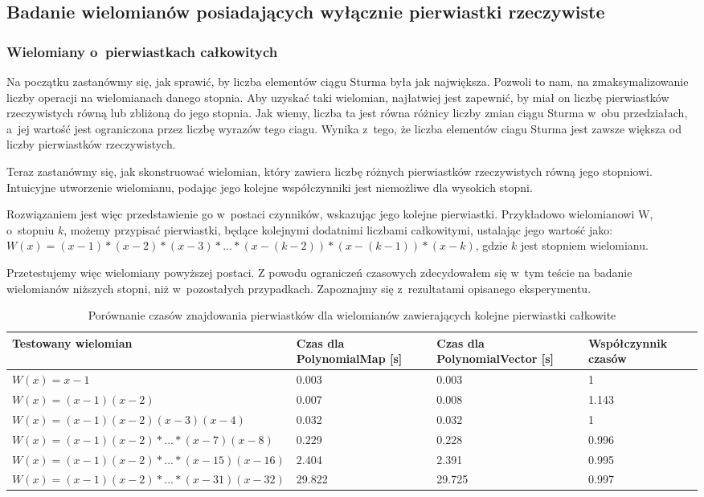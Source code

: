 \subsection{Badanie wielomianów posiadających wyłącznie pierwiastki rzeczywiste}

\subsubsection{Wielomiany o~pierwiastkach całkowitych}

Na początku zastanówmy się, jak sprawić, by liczba elementów ciągu Sturma była jak największa. Pozwoli to nam, na zmaksymalizowanie liczby operacji na wielomianach danego stopnia. Aby uzyskać taki wielomian, najłatwiej jest zapewnić, by miał on liczbę pierwiastków rzeczywistych równą lub zbliżoną do jego stopnia. Jak wiemy, liczba ta jest równa różnicy liczby zmian ciągu Sturma w~obu przedziałach, a~jej wartość jest ograniczona przez liczbę wyrazów tego ciagu. Wynika z~tego, że liczba elementów ciagu Sturma jest zawsze większa od liczby pierwiastków rzeczywistych.

Teraz zastanówmy się, jak skonstruować wielomian, który zawiera liczbę różnych pierwiastków rzeczywistych równą jego stopniowi. Intuicyjne utworzenie wielomianu, podając jego kolejne współczynniki jest niemożliwe dla wysokich stopni.

Rozwiązaniem jest więc przedstawienie go w~postaci czynników, wskazując jego kolejne pierwiastki. Przykładowo wielomianowi W, o~stopniu $k$, możemy przypisać pierwiastki, będące kolejnymi dodatnimi liczbami całkowitymi, ustalając jego wartość jako: \\ $W(x)=(x-1)*(x-2)*(x-3)*...*(x-(k-2))*(x-(k-1))*(x-k)$, gdzie $k$ jest stopniem wielomianu.

Przetestujemy więc wielomiany powyższej postaci. Z powodu ograniczeń czasowych zdecydowałem się w~tym teście na badanie wielomianów niższych stopni, niż w~pozostałych przypadkach. Zapoznajmy się z~rezultatami opisanego eksperymentu.

\begin{table}[H]
	\begin{tabular}{ |p{4cm}|p{2.75cm}|p{2.75cm}|p{3.5cm}|} 
		\hline
		Testowany wielomian & Czas dla PolynomialMap [s] & Czas dla PolynomialVector [s] & Współczynnik czasów \\
		\hline
		$W(x) = x-1$ & 0.003 & 0.003 & 1 \\
		$W(x) = (x-1)(x-2)$ & 0.007 & 0.008 & 1.143 \\
		$W(x) = (x-1)(x-2)(x-3)(x-4)$ & 0.032 & 0.032 & 1 \\
		$W(x) = (x-1)(x-2)*...*(x-7)(x-8)$ & 0.229 & 0.228 & 0.996 \\
		$W(x) = (x-1)(x-2)*...*(x-15)(x-16)$ & 2.404 & 2.391 & 0.995 \\
		$W(x) = (x-1)(x-2)*...*(x-31)(x-32)$ & 29.822 & 29.725 & 0.997 \\
		\hline
	\end{tabular}
	\caption{Porównanie czasów znajdowania pierwiastków dla wielomianów zawierających kolejne pierwiastki całkowite}
\end{table}

